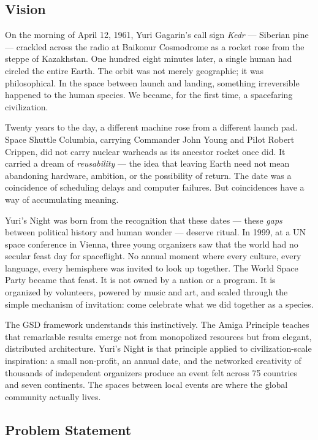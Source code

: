 \documentclass[11pt,letterpaper]{article}
\begin{document}
\subsection{Vision}

On the morning of April 12, 1961, Yuri Gagarin's call sign \emph{Kedr} — Siberian pine — crackled across the radio at Baikonur Cosmodrome as a rocket rose from the steppe of Kazakhstan. One hundred eight minutes later, a single human had circled the entire Earth. The orbit was not merely geographic; it was philosophical. In the space between launch and landing, something irreversible happened to the human species. We became, for the first time, a spacefaring civilization.

Twenty years to the day, a different machine rose from a different launch pad. Space Shuttle Columbia, carrying Commander John Young and Pilot Robert Crippen, did not carry nuclear warheads as its ancestor rocket once did. It carried a dream of \emph{reusability} — the idea that leaving Earth need not mean abandoning hardware, ambition, or the possibility of return. The date was a coincidence of scheduling delays and computer failures. But coincidences have a way of accumulating meaning.

Yuri's Night was born from the recognition that these dates — these \emph{gaps} between political history and human wonder — deserve ritual. In 1999, at a UN space conference in Vienna, three young organizers saw that the world had no secular feast day for spaceflight. No annual moment where every culture, every language, every hemisphere was invited to look up together. The World Space Party became that feast. It is not owned by a nation or a program. It is organized by volunteers, powered by music and art, and scaled through the simple mechanism of invitation: come celebrate what we did together as a species.

The GSD framework understands this instinctively. The Amiga Principle teaches that remarkable results emerge not from monopolized resources but from elegant, distributed architecture. Yuri's Night is that principle applied to civilization-scale inspiration: a small non-profit, an annual date, and the networked creativity of thousands of independent organizers produce an event felt across 75 countries and seven continents. The spaces between local events are where the global community actually lives.

\subsection{Problem Statement}
\end{document}
